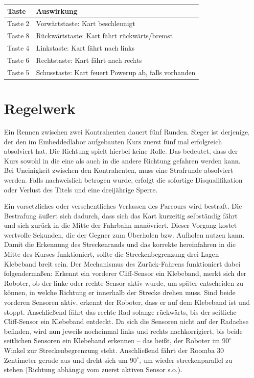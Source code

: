 \vspace{0.5cm}
\begin{tabular}{|l|l|}
\hline
\textbf{Taste} & \textbf{Auswirkung} \\ \hline
Taste 2 & Vorwärtstaste: Kart beschleunigt \\ \hline
Taste 8 & Rückwärtstaste: Kart fährt rückwärts/bremst \\ \hline
Taste 4 & Linkstaste: Kart fährt nach links \\ \hline
Taste 6 & Rechtstaste: Kart fährt nach rechts \\ \hline
Taste 5 & Schusstaste: Kart feuert Powerup ab, falls vorhanden \\ \hline 
\end{tabular}
\vspace{0.5cm}

\section{Regelwerk}
Ein Rennen zwischen zwei Kontrahenten dauert fünf Runden. Sieger ist derjenige, der den im Embeddedlabor aufgebauten Kurs zuerst fünf mal erfolgreich absolviert hat. Die Richtung spielt hierbei keine Rolle. Das bedeutet, dass der Kurs sowohl in die eine als auch in die andere Richtung gefahren werden kann. Bei Uneinigkeit zwischen den Kontrahenten, muss eine Strafrunde absolviert werden. Falls nachweislich betrogen wurde, erfolgt die sofortige Disqualifikation oder Verlust des Titels und eine dreijährige Sperre. 

Ein vorsetzliches oder versehentliches Verlassen des Parcours wird bestraft. Die Bestrafung äußert sich dadurch, dass sich das Kart kurzeitig selbständig fährt und sich zurück in die Mitte der Fahrbahn manövriert. Dieser Vorgang kostet wertvolle Sekunden, die der Gegner zum Überholen bzw. Aufholen nutzen kann. Damit die Erkennung des Streckenrands und das korrekte hereinfahren in die Mitte des Kurses funktioniert, sollte die Streckenbegrenzung drei Lagen Klebeband breit sein. Der Mechanismus des Zurück-Fahrens funktioniert dabei folgendermaßen: Erkennt ein vorderer Cliff-Sensor ein Klebeband, merkt sich der Roboter, ob der linke oder rechte Sensor aktiv wurde, um später entscheiden zu können, in welche Richtung er innerhalb der Strecke drehen muss. Sind beide vorderen Sensoren aktiv, erkennt der Roboter, dass er auf dem Klebeband ist und stoppt. Anschließend fährt das rechte Rad solange rückwärts, bis der seitliche Cliff-Sensor ein Klebeband entdeckt. Da sich die Sensoren nicht auf der Radachse befinden, wird nun jeweils nocheinmal links und rechts nachkorrigiert, bis beide seitlichen Sensoren ein Klebeband erkennen – das heißt, der Roboter im $90^\circ$ Winkel zur Streckenbegrenzung steht. Anschließend fährt der Roomba 30 Zentimeter gerade aus und dreht sich um $90^\circ$, um wieder streckenparallel zu stehen (Richtung abhängig vom zuerst aktiven Sensor s.o.).

